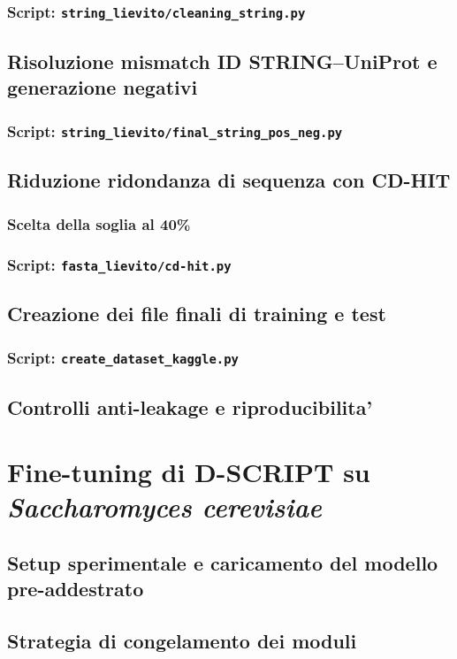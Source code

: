 \documentclass[12pt,a4paper,oneside]{report} %
\begin{document}
\subsection{Script: \texttt{string\_lievito/cleaning\_string.py}}
\section{Risoluzione mismatch ID STRING--UniProt e generazione negativi}
\subsection{Script: \texttt{string\_lievito/final\_string\_pos\_neg.py}}
\section{Riduzione ridondanza di sequenza con CD-HIT}
\subsection{Scelta della soglia al 40\%}
\subsection{Script: \texttt{fasta\_lievito/cd-hit.py}}
\section{Creazione dei file finali di training e test}
\subsection{Script: \texttt{create\_dataset\_kaggle.py}}
\section{Controlli anti-leakage e riproducibilita'}

\chapter{Fine-tuning di D-SCRIPT su \textit{Saccharomyces cerevisiae}}
\section{Setup sperimentale e caricamento del modello pre-addestrato}
\section{Strategia di congelamento dei moduli}
\end{document}

